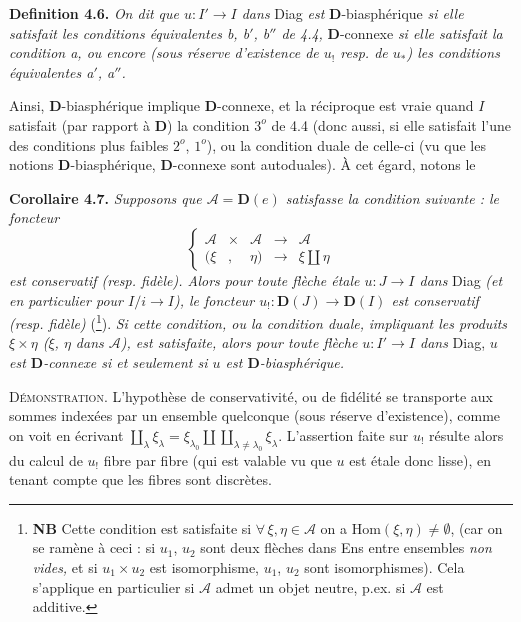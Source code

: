 \documentclass[11pt]{article}
\newcommand{\printedpage}[1]{\marginpar{\footnotesize p.~#1}}
\newcommand{\msp}[1]{\marginpar{\footnotesize [#1]}}
\newcommand{\D}{\mathbf{D}}
\begin{document}
\textbf{Definition 4.6.} \textit{On dit que $u : I' \longrightarrow I$ dans} Diag \textit{est} $\D$-biasphérique \textit{si elle satisfait les conditions équivalentes b, b$'$, b$''$ de 4.4,} $\D$-connexe \textit{si elle satisfait la condition a, ou encore (sous réserve d'existence de $u_!$ resp. de $u_*$) les conditions équivalentes a$'$, a$''$.} %

Ainsi, $\D$-biasphérique implique $\D$-connexe, et la réciproque est vraie quand $I$ satisfait (par rapport à $\D$) la condition $3^o$ de 4.4 (donc aussi, si elle satisfait l'une des conditions plus faibles $2^o$, $1^o$), ou la condition duale de celle-ci (vu que les notions $\D$-biasphérique, $\D$-connexe sont autoduales). À cet égard, notons le

\textbf{Corollaire 4.7.} \textit{Supposons que $\mathcal{A} = \D(e)$ satisfasse la condition suivante : le foncteur}
\[
\left\{
\begin{array}{lcccl}
\mathcal{A} & \times & \mathcal{A} & \longrightarrow & \mathcal{A} \\[1ex]
(\xi & , & \eta) & \longrightarrow & \xi \amalg \eta
\end{array}
\right.
\]
\textit{est conservatif (resp. fidèle). Alors pour toute flèche étale $u : J \longrightarrow I$ dans} Diag \textit{(et en particulier pour $I/i \longrightarrow I$), le foncteur $u_! : \D(J) \longrightarrow \D(I)$ est conservatif (resp. fidèle)} (\footnote{\textbf{NB} Cette condition est satisfaite si $\forall\, \xi, \eta \in \mathcal{A}$ on a $\mathrm{Hom}(\xi,\eta) \neq \emptyset$, (car on se ramène à ceci : si $u_1$,
$u_2$ sont deux flèches dans Ens entre ensembles \textit{non vides,} et si $u_1 \times u_2$ est isomorphisme, $u_1$, $u_2$ sont isomorphismes). Cela s'applique en particulier si $\mathcal{A}$ admet un objet neutre, p.ex. si $\mathcal{A}$ est additive.}). \textit{Si cette condition, ou la condition duale,}
\printedpage{40}
\msp{page 64bis}
\textit{impliquant les produits $\xi\times\eta$ ($\xi$, $\eta$ dans $\mathcal{A}$), est satisfaite, alors pour toute flèche $u : I' \longrightarrow I$ dans} Diag, \textit{$u$ est $\D$-connexe si et seulement si $u$ est $\D$-biasphérique.}

\textsc{Démonstration.} L'hypothèse de conservativité, ou de fidélité se transporte aux sommes indexées par un ensemble quelconque (sous réserve d'existence), comme on voit en écrivant $\coprod\limits_{\lambda} \xi_\lambda = \xi_{\lambda_0} \amalg \coprod\limits_{\lambda\neq\lambda_0} \xi_\lambda$. L'assertion faite sur $u_!$ résulte alors du calcul de $u_!$ fibre par fibre (qui est valable vu que $u$ est étale donc lisse), en tenant compte que les fibres sont discrètes.
\end{document}
